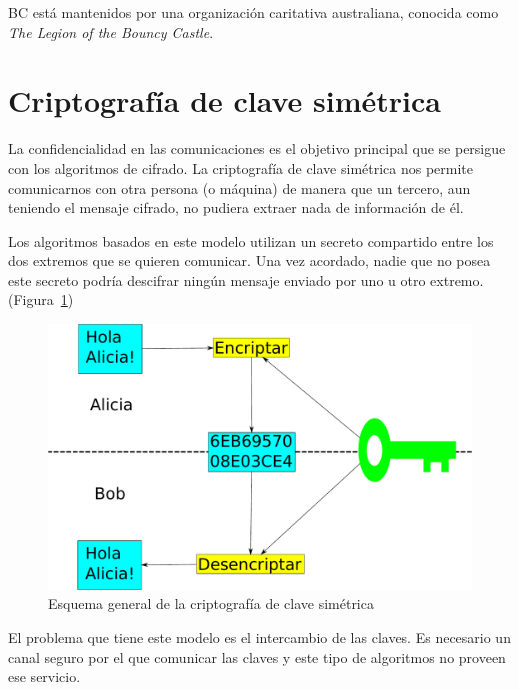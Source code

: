 BC está mantenidos por una organización caritativa australiana, conocida como \emph{The Legion of the Bouncy Castle}. \emph{\parencite{Reference4}}


\section{Criptografía de clave simétrica}

La confidencialidad en las comunicaciones es el objetivo principal que se persigue con los algoritmos de cifrado. La criptografía de clave simétrica nos permite comunicarnos con otra persona (o máquina) de manera que un tercero, aun teniendo el mensaje cifrado, no pudiera extraer nada de información de él.

Los algoritmos basados en este modelo utilizan un secreto compartido entre los dos extremos que se quieren comunicar. Una vez acordado, nadie que no posea este secreto podría descifrar ningún mensaje enviado por uno u otro extremo. (Figura~\ref{fig:SymmetricKeyEncryption})

\begin{figure}[ht]
  \centering
  \includegraphics[scale=0.4]{Figures/SymmetricKeyEncryption}
  \decoRule
  \caption[Criptografía de clave simétrica (Esquema)]{Esquema general de la criptografía de clave simétrica}
  \label{fig:SymmetricKeyEncryption}
\end{figure}

El problema que tiene este modelo es el intercambio de las claves. Es necesario un canal seguro por el que comunicar las claves y este tipo de algoritmos no proveen ese servicio. \emph{\parencite{Reference19}}

